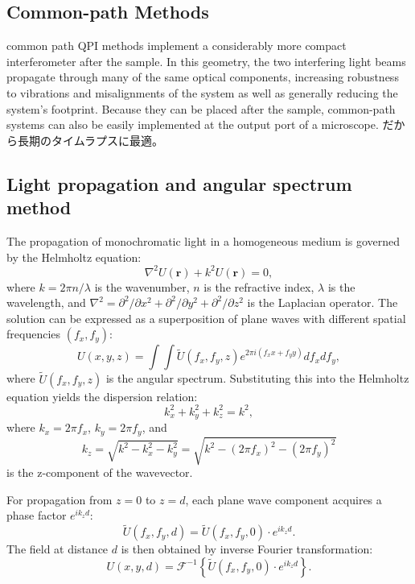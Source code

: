 \subsection{Common-path Methods}
common path QPI methods implement a considerably more compact interferometer after the sample. In this geometry, the two interfering light beams propagate through many of the same optical components, increasing robustness to vibrations and misalignments of the system as well as generally reducing the system's footprint. Because they can be placed after the sample, common-path systems can also be easily implemented at the output port of a microscope.
だから長期のタイムラプスに最適。

\subsection{Light propagation and angular spectrum method}
The propagation of monochromatic light in a homogeneous medium is governed by the Helmholtz equation:
\begin{equation}
\nabla^2 U(\mathbf{r}) + k^2 U(\mathbf{r}) = 0,
\end{equation}
where $k = 2\pi n/\lambda$ is the wavenumber, $n$ is the refractive index, $\lambda$ is the wavelength, and $\nabla^2 = \partial^2/\partial x^2 + \partial^2/\partial y^2 + \partial^2/\partial z^2$ is the Laplacian operator. The solution can be expressed as a superposition of plane waves with different spatial frequencies $(f_x, f_y)$:
\begin{equation}
U(x,y,z) = \int\int \tilde{U}(f_x, f_y, z) e^{2\pi i(f_x x + f_y y)} df_x df_y,
\end{equation}
where $\tilde{U}(f_x, f_y, z)$ is the angular spectrum. Substituting this into the Helmholtz equation yields the dispersion relation:
\begin{equation}
k_x^2 + k_y^2 + k_z^2 = k^2,
\end{equation}
where $k_x = 2\pi f_x$, $k_y = 2\pi f_y$, and
\begin{equation}
k_z = \sqrt{k^2 - k_x^2 - k_y^2} = \sqrt{k^2 - (2\pi f_x)^2 - (2\pi f_y)^2}
\end{equation}
is the z-component of the wavevector.

For propagation from $z=0$ to $z=d$, each plane wave component acquires a phase factor $e^{i k_z d}$:
\begin{equation}
\tilde{U}(f_x, f_y, d) = \tilde{U}(f_x, f_y, 0) \cdot e^{i k_z d}.
\end{equation}
The field at distance $d$ is then obtained by inverse Fourier transformation:
\begin{equation}
U(x,y,d) = \mathcal{F}^{-1}\left\{\tilde{U}(f_x, f_y, 0) \cdot e^{i k_z d}\right\}.
\end{equation}

